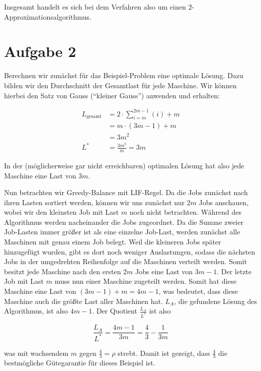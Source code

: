 \documentclass[12pt,a4paper]{article}
\begin{document}
\begin{enumerate}[a)]
 	Insgesamt handelt es sich bei dem Verfahren also um einen \(2\)-Appro\-xi\-ma\-tions\-algorithmus.
 	
 	
\end{enumerate}

\section*{Aufgabe 2}

Berechnen wir zunächst für das Beispiel-Problem eine optimale Lösung. Dazu bilden wir den Durchschnitt der Gesamtlast für jede Maschine. Wir können hierbei den Satz von Gauss ("`kleiner Gauss"') anwenden und erhalten:

\begin{align*}
	L_{\text{gesamt}} &= 2 \cdot \sum_{i=m}^{2m-1}(i) + m\\
	&= m \cdot (3m - 1) + m\\
	&= 3m^2\\
	L^* &= \frac{3m^2}{m} = 3m
\end{align*}

In der (möglicherweise gar nicht erreichbaren) optimalen Lösung hat also jede Maschine eine Last von $3m$.

Nun betrachten wir Greedy-Balance mit LIF-Regel. Da die Jobs zunächst nach ihren Lasten sortiert werden, können wir uns zunächst nur $2m$ Jobs anschauen, wobei wir den kleinsten Job mit Last $m$ noch nicht betrachten. Während des Algorithmus werden nacheinander die Jobs zugeordnet. Da die Summe zweier Job-Lasten immer größer ist als eine einzelne Job-Last, werden zunächst alle Maschinen mit genau einem Job belegt. Weil die kleineren Jobs später hinzugefügt wurden, gibt es dort noch weniger Auslastungen, sodass die nächsten Jobs in der umgedrehten Reihenfolge auf die Maschinen verteilt werden. Somit besitzt jede Maschine nach den ersten $2m$ Jobs eine Last von $3m-1$. Der letzte Job mit Last $m$ muss nun einer Maschine zugeteilt werden. Somit hat diese Maschine eine Last von $(3m-1)+m = 4m-1$, was bedeutet, dass diese Maschine auch die größte Last aller Maschinen hat. $L_A$, die gefundene Lösung des Algorithmus, ist also $4m-1$. Der Quotient $\frac{L_A}{L^*}$ ist also

$$\frac{L_A}{L^*} = \frac{4m-1}{3m} = \frac{4}{3} - \frac{1}{3m}$$

was mit wachsendem $m$ gegen $\frac{4}{3} = \rho$ strebt. Damit ist gezeigt, dass $\frac{4}{3}$ die bestmögliche Gütegarantie für dieses Beispiel ist.
\end{document}
